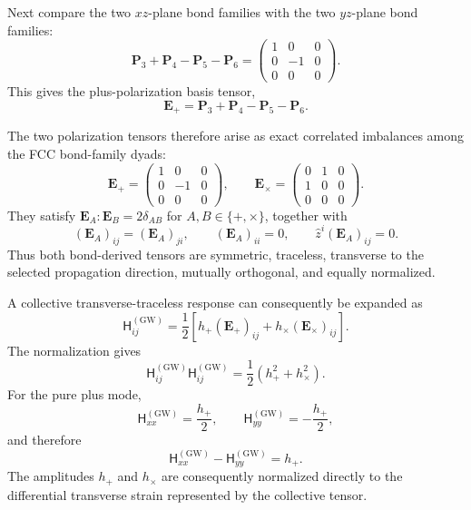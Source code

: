 Next compare the two $xz$-plane bond families with the two $yz$-plane bond families:
\begin{equation}
    \mathbf{P}_{3} + \mathbf{P}_{4} - \mathbf{P}_{5} - \mathbf{P}_{6} = 
    \begin{pmatrix}
        1 & 0 & 0 \\
        0 & -1 & 0 \\
        0 & 0 & 0
    \end{pmatrix}.
\end{equation}
This gives the plus-polarization basis tensor,
\begin{equation}
    \mathbf{E}_{+} = \mathbf{P}_{3} + \mathbf{P}_{4} - \mathbf{P}_{5} - \mathbf{P}_{6}.
\end{equation}

The two polarization tensors therefore arise as exact correlated imbalances among the FCC bond-family dyads:
\begin{equation}
    \mathbf{E}_{+} = 
    \begin{pmatrix}
        1 & 0 & 0 \\
        0 & -1 & 0 \\
        0 & 0 & 0
    \end{pmatrix},
    \qquad
    \mathbf{E}_{\times} = 
    \begin{pmatrix}
        0 & 1 & 0 \\
        1 & 0 & 0 \\
        0 & 0 & 0
    \end{pmatrix}.
\end{equation}
They satisfy $\mathbf{E}_{A} : \mathbf{E}_{B} = 2\delta_{AB}$ for $A,B \in \{+,\times\}$, together with
\begin{equation}
    (\mathbf{E}_{A})_{ij} = (\mathbf{E}_{A})_{ji}, \qquad (\mathbf{E}_{A})_{ii} = 0, \qquad \hat{z}^{i} (\mathbf{E}_{A})_{ij} = 0.
\end{equation}
Thus both bond-derived tensors are symmetric, traceless, transverse to the selected propagation direction, mutually orthogonal, and equally normalized.

A collective transverse-traceless response can consequently be expanded as
\begin{equation}
    \mathsf{H}_{ij}^{(\mathrm{GW})} = \frac{1}{2} \left[ h_{+}(\mathbf{E}_{+})_{ij} + h_{\times}(\mathbf{E}_{\times})_{ij} \right].
\end{equation}
The normalization gives
\begin{equation}
    \mathsf{H}_{ij}^{(\mathrm{GW})} \mathsf{H}_{ij}^{(\mathrm{GW})} = \frac{1}{2} \left( h_{+}^{2} + h_{\times}^{2} \right).
\end{equation}
For the pure plus mode,
\begin{equation}
    \mathsf{H}_{xx}^{(\mathrm{GW})} = \frac{h_{+}}{2}, \qquad \mathsf{H}_{yy}^{(\mathrm{GW})} = -\frac{h_{+}}{2},
\end{equation}
and therefore
\begin{equation}
    \mathsf{H}_{xx}^{(\mathrm{GW})} - \mathsf{H}_{yy}^{(\mathrm{GW})} = h_{+}.
\end{equation}
The amplitudes $h_{+}$ and $h_{\times}$ are consequently normalized directly to the differential transverse strain represented by the collective tensor.

